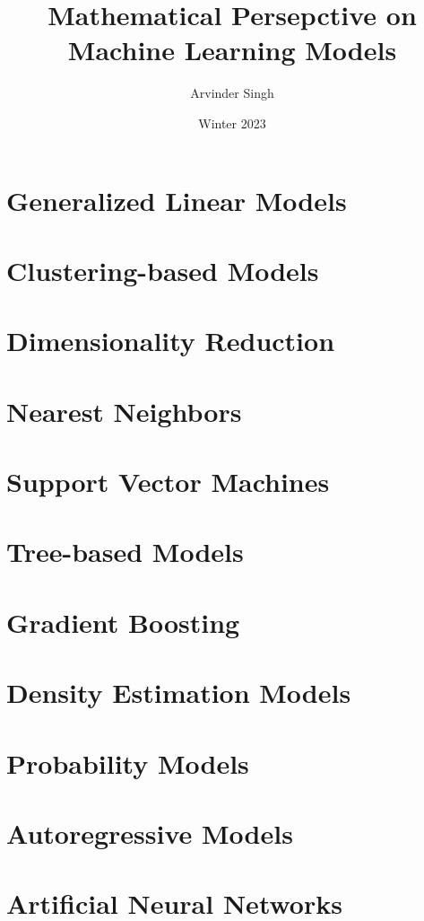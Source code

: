 \documentclass{book}
\title{Mathematical Persepctive on Machine Learning Models}
\author{Arvinder Singh}
\date{Winter 2023}
\begin{document}
\maketitle
\tableofcontents

\part{Generalized Linear Models}


\part{Clustering-based Models}

\part{Dimensionality Reduction}

\part{Nearest Neighbors}

\part{Support Vector Machines}

\part{Tree-based Models}

\part{Gradient Boosting}

\part{Density Estimation Models}

\part{Probability Models}

\part{Autoregressive Models}

\part{Artificial Neural Networks}
\end{document}
